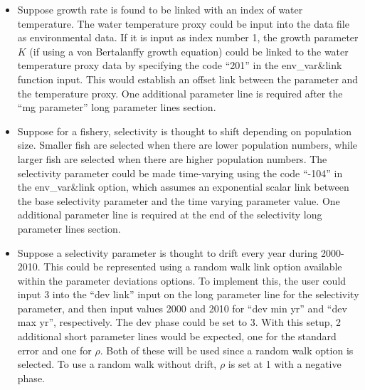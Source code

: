 \begin{itemize}
	\item Suppose growth rate is found to be linked with an index of water temperature. The water temperature proxy could be input into the data file as environmental data. If it is input as index number 1, the growth parameter $K$ (if using a von Bertalanffy growth equation) could be linked to the water temperature proxy data by specifying the code ``201'' in the env\_var\&link function input. This would establish an offset link between the parameter and the temperature proxy. One additional parameter line is required after the ``\gls{mg} parameter'' long parameter lines section.
	\item Suppose for a fishery, selectivity is thought to shift depending on population size. Smaller fish are selected when there are lower population numbers, while larger fish are selected when there are higher population numbers. The selectivity parameter could be made time-varying using the code ``-104'' in the env\_var\&link option, which assumes an exponential scalar link between the base selectivity parameter and the time varying parameter value. One additional parameter line is required at the end of the selectivity long parameter lines section.
\end{itemize}


\begin{itemize}
	\item Suppose a selectivity parameter is thought to drift every year during 2000-2010. This could be represented using a random walk link option available within the parameter deviations options. To implement this, the user could input 3 into the ``dev link'' input on the long parameter line for the selectivity parameter, and then input values 2000 and 2010 for ``dev min yr'' and ``dev max yr'', respectively. The dev phase could be set to 3. With this setup, 2 additional short parameter lines would be expected, one for the standard error and one for $\rho$. Both of these will be used since a random walk option is selected. To use a random walk without drift, $\rho$ is set at 1 with a negative phase.
\end{itemize}


